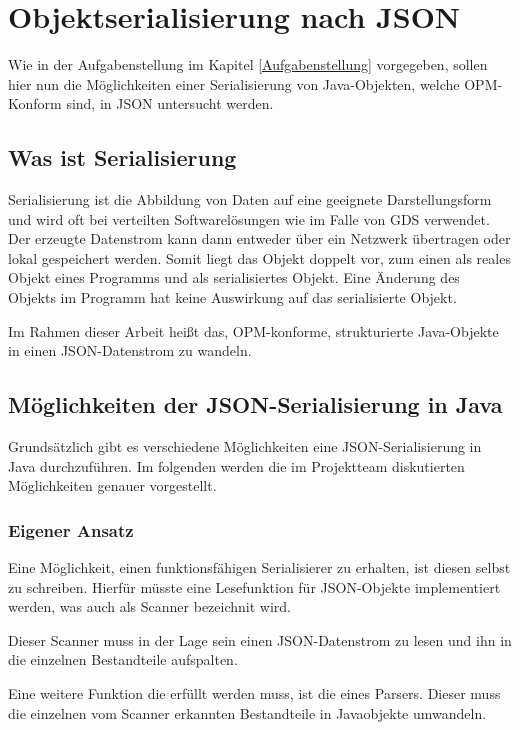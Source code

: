 \section{Objektserialisierung nach JSON}
Wie in der Aufgabenstellung im Kapitel \ref{Aufgabenstellung} vorgegeben, sollen hier nun die M\"oglichkeiten einer Serialisierung von Java-Objekten, welche OPM-Konform sind, in \ac{JSON} untersucht werden.

\subsection{Was ist Serialisierung}
Serialisierung ist die Abbildung von Daten auf eine geeignete Darstellungsform und wird oft bei verteilten Softwarel\"osungen wie im Falle von \ac{GDS} verwendet. Der erzeugte Datenstrom kann dann entweder \"uber ein Netzwerk \"ubertragen oder lokal gespeichert werden. Somit liegt das Objekt doppelt vor, zum einen als reales Objekt eines Programms und als serialisiertes Objekt. Eine \"Anderung des Objekts im Programm hat keine Auswirkung auf das serialisierte Objekt. \cite{WikiSeri}

Im Rahmen dieser Arbeit hei\ss{}t das, \ac{OPM}-konforme, strukturierte Java-Objekte in einen \ac{JSON}-Datenstrom zu wandeln. 

\subsection{M\"oglichkeiten der JSON-Serialisierung in Java}
Grunds\"atzlich gibt es verschiedene M\"oglichkeiten eine \ac{JSON}-Serialisierung in Java 
durchzuf\"uhren. Im folgenden werden die im Projektteam diskutierten M\"oglichkeiten genauer vorgestellt. 

\subsubsection{Eigener Ansatz}
Eine M\"oglichkeit, einen funktionsf\"ahigen Serialisierer zu erhalten, ist diesen selbst zu schreiben. Hierf\"ur m\"usste eine Lesefunktion f\"ur \ac{JSON}-Objekte implementiert werden, was auch als Scanner bezeichnit wird. 

Dieser Scanner muss in der Lage sein einen \ac{JSON}-Datenstrom zu lesen und ihn in die einzelnen Bestandteile aufspalten.

Eine weitere Funktion die erf\"ullt werden muss, ist die eines Parsers. Dieser muss die einzelnen vom Scanner erkannten Bestandteile in Javaobjekte umwandeln.

